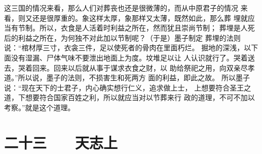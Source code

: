 \documentclass[12pt,UTF8]{ctexbook}
\begin{document}
这三国的情况来看，那么人们对葬丧也还是很微薄的，而从中原君子的情况 
来看，则又还是很厚重的。象这样太厚，象那样又太薄，既然如此，那么葬 
埋就应当有节制。所以，衣食是人活着时利益之所在，然而犹且崇尚节制； 
葬埋是人死后的利益之所在，为何独不对此加以节制呢？（于是）墨子制定 
葬埋的法则说：“棺材厚三寸，衣衾三件，足以使死者的骨肉在里面朽烂。 
掘地的深浅，以下面没有湿漏、尸体气味不要泄出地面上为度。坟堆足以让 
人认识就行了。哭着送去，哭着回来。回来以后就从事于谋求衣食之财，以 
助给祭祀之用，向双亲尽孝道。”所以说，墨子的法则，不损害生和死两方 
面的利益，即此之故。 
所以墨子说：“现在天下的士君子，内心确实想行仁义，追求做上士， 
上想要符合圣王之道，下想要符合国家百姓之利，所以就应当对以节葬来行 
政的道理，不可不加以考察。”就是这个道理。 


\chapter{二十三　　天志上}
\end{document}
